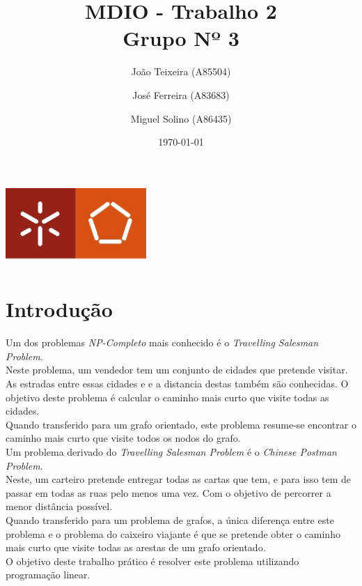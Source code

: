 \documentclass[a4paper]{report}
\begin{document}
\title{MDIO - Trabalho 2\\ 
\large Grupo Nº 3}
\author{João Teixeira (A85504) \and José Ferreira (A83683) \and Miguel Solino (A86435)}
\date{\today}

\begin{center}
    \begin{minipage}{0.75\linewidth}
        \centering
        \includegraphics[width=0.4\textwidth]{images/eng.jpeg}\par\vspace{1cm}
        \vspace{1.5cm}
        \href{https://www.uminho.pt/PT}
        {\color{black}{\scshape\LARGE Universidade do Minho}} \par
        \vspace{1cm}
        \href{https://www.di.uminho.pt/}
        {\color{black}{\scshape\Large Departamento de Informática}} \par
        \vspace{1.5cm}
        \maketitle
    \end{minipage}
\end{center}

\tableofcontents

\pagebreak

\chapter{Introdução}
Um dos problemas \textit{NP-Completo} mais conhecido é o \textit{Travelling
Salesman Problem}. \\
Neste problema, um vendedor tem um conjunto de cidades que pretende visitar. As
estradas entre essas cidades e e a distancia destas também são conhecidas. O
objetivo deste problema é calcular o caminho mais curto que visite todas as
cidades.\\
Quando transferido para um grafo orientado, este problema resume-se
encontrar o caminho mais curto que visite todos os nodos do grafo.\\
Um problema derivado do \textit{Travelling Salesman Problem} é o \textit{Chinese
Postman Problem}.\\
Neste, um carteiro pretende entregar todas as cartas que tem, e para isso tem de
passar em todas as ruas pelo menos uma vez. Com o objetivo de percorrer a menor
distância possível.\\
Quando transferido para um problema de grafos, a única diferença entre este
problema e o problema do caixeiro viajante é que se pretende obter o caminho
mais curto que visite todas as arestas de um grafo orientado. \\
O objetivo deste trabalho prático é resolver este problema
utilizando programação linear.
\end{document}
